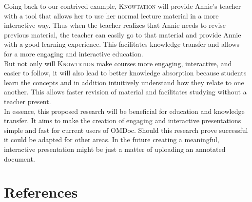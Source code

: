 \documentclass[twoside, 12pt]{article}
\newcommand{\sys}{\textsc{Knowtation}\xspace}
\begin{document}
Going back to our contrived example, \sys will provide Annie's teacher with a tool that allows her to use her normal lecture material in a more interactive way. Thus when the teacher realizes that Annie needs to revise previous material, the teacher can easily go to that material and provide Annie with a good learning experience. This facilitates knowledge transfer and allows for a more engaging and interactive education.\\

But not only will \sys make courses more engaging, interactive, and easier to follow, it will also lead to better knowledge absorption because students learn the concepts and in addition intuitively understand how they relate to one another. This allows faster revision of material and facilitates studying without a teacher present.\\

In essence, this proposed research will be beneficial for education and knowledge transfer. It aims to make the creation of engaging and interactive presentations simple and fast for current users of OMDoc. Should this research prove successful it could be adapted for other areas. In the future creating a meaningful, interactive presentation might be just a matter of uploading an annotated document.

\newpage
\section{References}

{}

\end{document}
